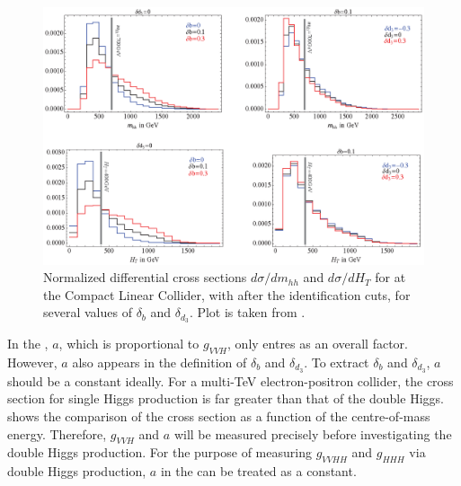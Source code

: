 \begin{figure}[htbp]
\centering
\includegraphics[width=1\textwidth]{theory/MhhHtDistribution}
\caption[]
{Normalized differential cross sections $d\sigma/dm_{hh}$ and $d\sigma/dH_{T}$ for  at the Compact Linear Collider, with  after the identification cuts, for several values of $\delta_{b}$ and $\delta_{d_3}$. Plot is taken from \cite{Contino:2013gna}.}
\label{fig:theoryMhhHtDistribution}
\end{figure}

In the , $a$, which is proportional to $g_{VVH}$, only entres as an overall factor. However, $a$ also appears in the definition of $\delta_{b}$ and $\delta_{d_3}$. To extract $\delta_{b}$ and $\delta_{d_3}$, $a$ should be a constant ideally. For a multi-TeV electron-positron collider, the cross section for single Higgs production is far greater than that of the double Higgs.  shows the comparison of the cross section as a function of the centre-of-mass energy. Therefore, $g_{VVH}$ and $a$ will be measured precisely before investigating the double Higgs production. For the purpose of measuring $g_{VVHH}$ and $g_{HHH}$ via double Higgs production, $a$ in the  can be treated as a constant.

